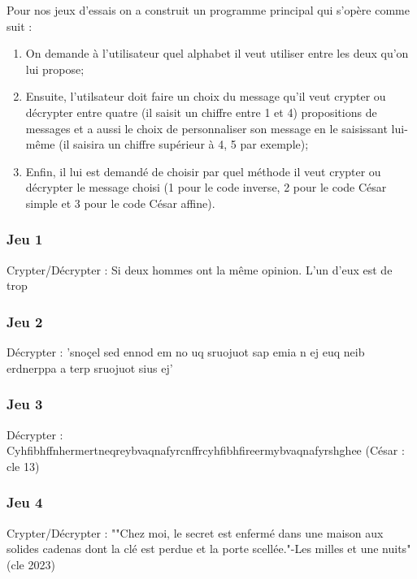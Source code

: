 \documentclass[12pt,french,titlepage]{article}
\begin{document}
	Pour nos jeux d'essais on a construit un programme principal qui s'opère comme suit :
		\begin{enumerate}
			\item On demande à l'utilisateur quel alphabet il veut utiliser entre les deux qu'on lui propose;
			\item Ensuite, l'utilsateur doit faire un choix du message qu'il veut crypter ou décrypter entre quatre (il saisit un chiffre entre 1 et 4) propositions de messages et a aussi le choix de personnaliser son message en le saisissant lui-même (il saisira un chiffre supérieur à 4, 5 par exemple);
			\item Enfin, il lui est demandé de choisir par quel méthode il veut crypter ou décrypter le message choisi (1 pour le code inverse, 2 pour le code César simple et 3 pour le code César affine).
		\end{enumerate}
		
		
		\subsubsection{Jeu 1}
				
	Crypter/Décrypter : Si deux hommes ont la même opinion. L’un d’eux est de trop


		\subsubsection{Jeu 2}
		
	Décrypter : 'snoçel sed ennod em no uq sruojuot sap emia n ej euq neib erdnerppa a terp
sruojuot sius ej'

		\subsubsection{Jeu 3}
		
	Décrypter : Cyhfibhffnhermertneqreybvaqnafyrcnffrcyhfibhfireermybvaqnafyrshghee (César : cle 13)

		\subsubsection{Jeu 4}
		
	Crypter/Décrypter : ""Chez moi, le secret est enfermé dans une maison aux solides cadenas dont la clé est perdue et la porte scellée."-Les milles et une nuits" (cle 2023)
	
	
	
	
	
	
\end{document}
